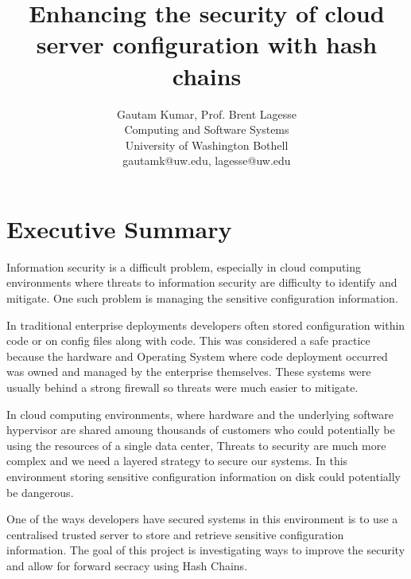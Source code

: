 \documentclass[10pt,conference]{IEEEtran}
\begin{document}
\title{Enhancing the security of cloud server configuration with hash chains}


\author{
{\rm Gautam Kumar, Prof. Brent Lagesse}\\
Computing and Software Systems\\
University of Washington Bothell\\
gautamk@uw.edu, lagesse@uw.edu
} %

\maketitle
\thispagestyle{empty}


\section{Executive Summary}
Information security is a difficult problem, especially in cloud computing environments where 
threats to information security are difficulty to identify and mitigate. One such problem is 
managing the sensitive configuration information.

In traditional enterprise deployments developers often stored configuration within code or on config 
files along with code. This was considered a safe practice because the hardware and Operating System 
where code deployment occurred was owned and managed by the enterprise themselves. These systems 
were usually behind a strong firewall so threats were much easier to mitigate. 

In cloud computing environments, where hardware and the underlying software hypervisor are shared 
amoung thousands of customers who could potentially be using the resources of a single data center, 
Threats to security are much more complex and we need a layered strategy to secure our systems. In 
this environment storing sensitive configuration information on disk could potentially be dangerous.



One of the ways developers have secured systems in this environment is to use a centralised trusted 
server to store and retrieve sensitive configuration information. The goal of this project is 
investigating ways to improve the security and allow for forward secracy using Hash 
Chains\cite{tian_self-healing_2008}.
\end{document}
